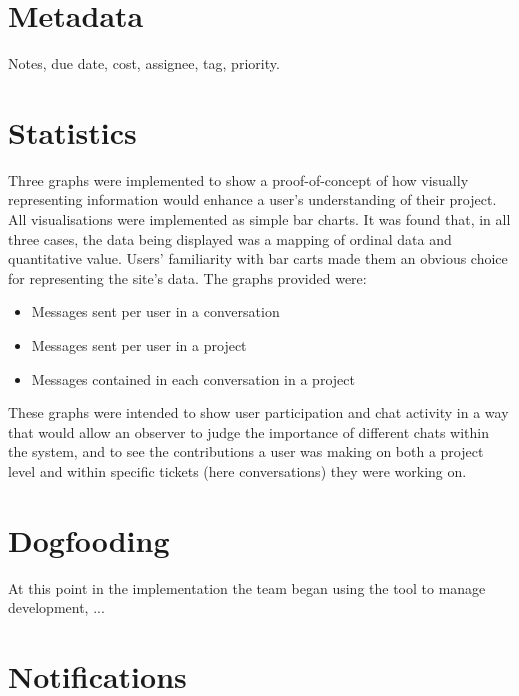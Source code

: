 \documentclass[a4paper]{l3proj}
\begin{document}
\section{Metadata}
\label{metadata}

Notes, due date, cost, assignee, tag, priority.

\section{Statistics}
\label{statistics}

Three graphs were implemented to show a proof-of-concept of how visually representing information would enhance a user’s understanding of their project. 
All visualisations were implemented as simple bar charts. It was found that, in all three cases, the data being displayed was a mapping of ordinal data and quantitative value. Users’ familiarity with bar carts made them an obvious choice for representing the site’s data. 
The graphs provided were:

\begin{itemize}
\item Messages sent per user in a conversation
\item Messages sent per user in a project
\item Messages contained in each conversation in a project
\end{itemize}

These graphs were intended to show user participation and chat activity in a way that would allow an observer to judge the importance of different chats within the system, and to see the contributions a user was making on both a project level and within specific tickets (here conversations) they were working on.

\section{Dogfooding}
\label{dog}
At this point in the implementation the team began using the tool to manage development, ... 


\section{Notifications}
\label{notifications}
\end{document}
